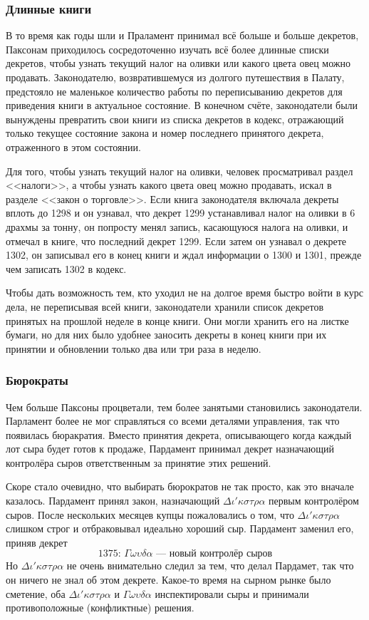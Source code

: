 \documentclass[12pt, a4paper]{article} %
\begin{document}
\subsubsection{Длинные книги}

В то время как годы шли и Праламент принимал всё больше и больше декретов, Паксонам приходилось сосредоточенно изучать всё более длинные списки декретов, чтобы узнать текущий налог на оливки или какого цвета овец можно продавать. Законодателю, возвратившемуся из долгого путешествия в Палату, предстояло не маленькое количество работы по переписыванию декретов для приведения книги в актуальное состояние. В конечном счёте, законодатели были вынуждены превратить свои книги из списка декретов в кодекс, отражающий только текущее состояние закона и номер последнего принятого декрета, отраженного в этом состоянии.

Для того, чтобы узнать текущий налог на оливки, человек просматривал раздел <<налоги>>, а чтобы узнать какого цвета овец можно продавать, искал в разделе <<закон о торговле>>. Если книга законодателя включала декреты вплоть до 1298 и он узнавал, что декрет 1299 устанавливал налог на оливки в 6 драхмы за тонну, он попросту менял запись, касающуюся налога на оливки, и отмечал в книге, что последний декрет 1299. Если затем он узнавал о декрете 1302, он записывал его в конец книги и ждал информации о 1300 и 1301, прежде чем записать 1302 в кодекс.

Чтобы дать возможность тем, кто уходил не на долгое время быстро войти в курс дела, не переписывая всей книги, законодатели хранили список декретов принятых на прошлой неделе в конце книги. Они могли хранить его на листке бумаги, но для них было удобнее заносить декреты в конец книги при их принятии и обновлении только два или три раза в неделю.

\subsubsection{Бюрократы}

Чем больше Паксоны процветали, тем более занятыми становились законодатели. Парламент более не мог справляться со всеми деталями управления, так что появилась бюракратия. Вместо принятия декрета, описывающего когда каждый лот сыра будет готов к продаже, Пардамент принимал декрет назначающий контролёра сыров ответственным за принятие этих решений. 

Скоре стало очевидно, что выбирать бюрократов не так просто, как это вначале казалось. Пардамент принял закон, назначающий $\Delta\iota'\kappa\sigma\tau\rho\alpha$ первым контролёром сыров. После нескольких месяцев купцы пожаловались о том, что $\Delta\iota'\kappa\sigma\tau\rho\alpha$ слишком строг и отбраковывал идеально хороший сыр. Пардамент заменил его, приняв декрет
\[
    \mbox{1375: $\Gamma\omega\upsilon\delta\alpha$ --- новый контролёр сыров}
\]
Но $\Delta\iota'\kappa\sigma\tau\rho\alpha$ не очень внимательно следил за тем, что делал Пардамет, так что он ничего не знал об этом декрете. Какое-то время на сырном рынке было сметение, оба $\Delta\iota'\kappa\sigma\tau\rho\alpha$ и $\Gamma\omega\upsilon\delta\alpha$ инспектировали сыры и принимали противоположные (конфликтные) решения.
\end{document}
